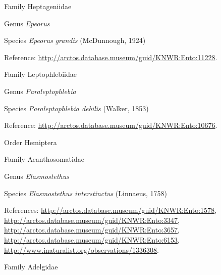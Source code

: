 \documentclass[9pt, article]{memoir}
\begin{document}
\begin{multicols}{2}
\vspace{6pt}\noindent\hspace{24pt}Family Heptageniidae


\vspace{6pt}\noindent\hspace{30pt}Genus \textit{Epeorus}


\vspace{6pt}\noindent\hspace{36pt}Species \textit{Epeorus grandis} (McDunnough, 1924)


Reference: 
\url{http://arctos.database.museum/guid/KNWR:Ento:11228}.

\vspace{6pt}\noindent\hspace{24pt}Family Leptophlebiidae


\vspace{6pt}\noindent\hspace{30pt}Genus \textit{Paraleptophlebia}


\vspace{6pt}\noindent\hspace{36pt}Species \textit{Paraleptophlebia debilis} (Walker, 1853)


Reference: 
\url{http://arctos.database.museum/guid/KNWR:Ento:10676}.

\vspace{6pt}\noindent\hspace{18pt}Order Hemiptera


\vspace{6pt}\noindent\hspace{24pt}Family Acanthosomatidae


\vspace{6pt}\noindent\hspace{30pt}Genus \textit{Elasmostethus}


\vspace{6pt}\noindent\hspace{36pt}Species \textit{Elasmostethus interstinctus} (Linnaeus, 1758)


References: 
\url{http://arctos.database.museum/guid/KNWR:Ento:1578}, 
\url{http://arctos.database.museum/guid/KNWR:Ento:3347}, 
\url{http://arctos.database.museum/guid/KNWR:Ento:3657}, 
\url{http://arctos.database.museum/guid/KNWR:Ento:6153}, 
\url{http://www.inaturalist.org/observations/1336308}.

\vspace{6pt}\noindent\hspace{24pt}Family Adelgidae



\end{multicols}
\end{document}
